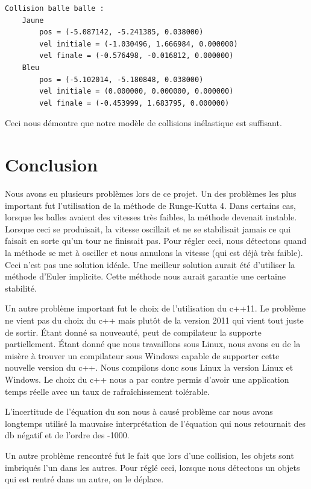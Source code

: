 \documentclass{article}
\begin{document}
\begin{verbatim}
Collision balle balle :
	Jaune
		pos = (-5.087142, -5.241385, 0.038000)
		vel initiale = (-1.030496, 1.666984, 0.000000)
		vel finale = (-0.576498, -0.016812, 0.000000)
	Bleu
		pos = (-5.102014, -5.180848, 0.038000)
		vel initiale = (0.000000, 0.000000, 0.000000)
		vel finale = (-0.453999, 1.683795, 0.000000)
\end{verbatim}

Ceci nous démontre que notre modèle de collisions inélastique est
suffisant.

\section*{Conclusion}

Nous avons eu plusieurs problèmes lors de ce projet. Un des problèmes
les plus important fut l'utilisation de la méthode de Runge-Kutta
4. Dans certains cas, lorsque les balles avaient des vitesses très
faibles, la méthode devenait instable. Lorsque ceci se produisait, la
vitesse oscillait et ne se stabilisait jamais ce qui faisait en sorte
qu'un tour ne finissait pas. Pour régler ceci, nous détectons quand la
méthode se met à osciller et nous annulons la vitesse (qui est déjà
très faible). Ceci n'est pas une solution idéale. Une meilleur
solution aurait été d'utiliser la méthode d'Euler implicite. Cette
méthode nous aurait garantie une certaine stabilité.

Un autre problème important fut le choix de l'utilisation du c++11. Le
problème ne vient pas du choix du c++ mais plutôt de la version 2011
qui vient tout juste de sortir. Étant donné sa nouveauté, peut de
compilateur la supporte partiellement. Étant donné que nous travaillons
sous Linux, nous avons eu de la misère à trouver un compilateur sous
Windows capable de supporter cette nouvelle version du c++. Nous
compilons donc sous Linux la version Linux et Windows. Le choix du
c++ nous a par contre permis d'avoir une application temps réelle avec
un taux de rafraîchissement tolérable.

L'incertitude de l'équation du son nous à causé problème car nous
avons longtemps utilisé la mauvaise interprétation de l'équation qui
nous retournait des db négatif et de l'ordre des -1000.

Un autre problème rencontré fut le fait que lors d'une collision, les
objets sont imbriqués l'un dans les autres. Pour réglé ceci, lorsque
nous détectons un objets qui est rentré dans un autre, on le déplace.
\end{document}

